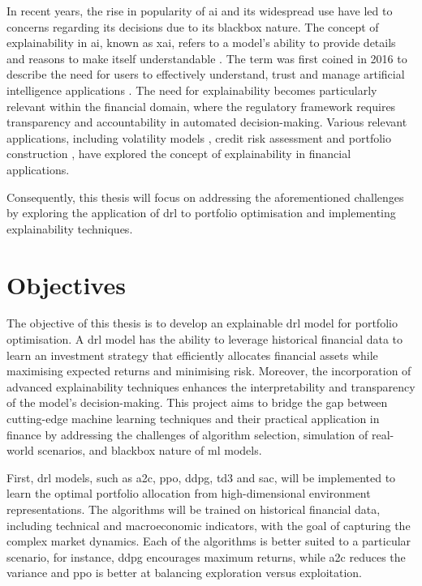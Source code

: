In recent years, the rise in popularity of \acrfull{ai} and its widespread use have led to concerns regarding its decisions due to its \gls{blackbox} nature. The concept of explainability in \acrshort{ai}, known as \acrfull{xai}, refers to a model's ability to provide details and reasons to make itself understandable \cite{BarredoArrieta2019}. The term was first coined in 2016 to describe the need for users to effectively understand, trust and manage artificial intelligence applications \cite{Gunning2019}. The need for explainability becomes particularly relevant within the financial domain, where the regulatory framework requires transparency and accountability in automated decision-making. Various relevant applications, including volatility models \cite{Brigo2021}, credit risk assessment \cite{GarciaCespedes2025} and portfolio construction \cite{Cortes2024}, have explored the concept of explainability in financial applications. 

Consequently, this thesis will focus on addressing the aforementioned challenges by exploring the application of \acrfull{drl} to portfolio optimisation and implementing explainability techniques.

\section{Objectives} \label{sec:introduction-objectives}

The objective of this thesis is to develop an explainable \acrlong{drl} model for portfolio optimisation. A \acrshort{drl} model has the ability to leverage historical financial data to learn an investment strategy that efficiently allocates financial assets while maximising expected returns and minimising risk. Moreover, the incorporation of advanced explainability techniques enhances the interpretability and transparency of the model's decision-making. This project aims to bridge the gap between cutting-edge machine learning techniques and their practical application in finance by addressing the challenges of algorithm selection, simulation of real-world scenarios, and \gls{blackbox} nature of \acrshort{ml} models.

First, \acrshort{drl} models, such as \acrfull{a2c}, \acrfull{ppo}, \acrfull{ddpg}, \acrfull{td3} and \acrfull{sac}, will be implemented to learn the optimal portfolio allocation from high-dimensional environment representations. The algorithms will be trained on historical financial data, including technical and macroeconomic indicators, with the goal of capturing the complex market dynamics. Each of the algorithms is better suited to a particular scenario, for instance, \acrshort{ddpg} encourages maximum returns, while \acrshort{a2c} reduces the variance and \acrshort{ppo} is better at balancing \gls{exploration} versus \gls{exploitation}.

